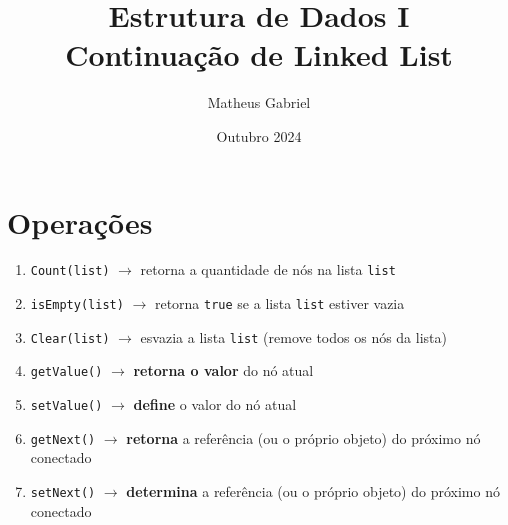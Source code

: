 \documentclass{article}
\title{Estrutura de Dados I \\ \large Continuação de Linked List}
\author{Matheus Gabriel}
\date{Outubro 2024}
\begin{document}
\maketitle

\section{Operações}

\begin{enumerate}
    \item \texttt{Count(list)} $\rightarrow$ retorna a quantidade de nós na lista \texttt{list}
    \item \texttt{isEmpty(list)} $\rightarrow$ retorna \texttt{true} se a lista \texttt{list} estiver vazia
    \item \texttt{Clear(list)} $\rightarrow$ esvazia a lista \texttt{list} (remove todos os nós da lista)
    \item \texttt{getValue()} $\rightarrow$ \textbf{retorna o valor} do nó atual
    \item \texttt{setValue()} $\rightarrow$ \textbf{define} o valor do nó atual
    \item \texttt{getNext()} $\rightarrow$ \textbf{retorna} a referência (ou o próprio objeto) do próximo nó conectado
    \item \texttt{setNext()} $\rightarrow$ \textbf{determina} a referência (ou o próprio objeto) do próximo nó conectado
\end{enumerate}
\end{document}
